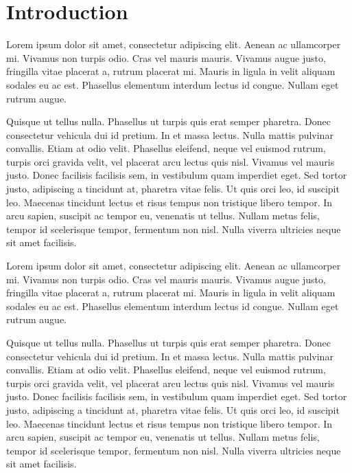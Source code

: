 \chapter{Introduction}

Lorem ipsum dolor sit amet, consectetur adipiscing elit. Aenean ac
ullamcorper mi. Vivamus non turpis odio. Cras vel mauris mauris. Vivamus
augue justo, fringilla vitae placerat a, rutrum placerat mi. Mauris in
ligula in velit aliquam sodales eu ac est. Phasellus elementum interdum
lectus id congue. Nullam eget rutrum augue.

Quisque ut tellus nulla. Phasellus ut turpis quis erat semper pharetra.
Donec consectetur vehicula dui id pretium. In et massa lectus. Nulla mattis
pulvinar convallis. Etiam at odio velit. Phasellus eleifend, neque vel
euismod rutrum, turpis orci gravida velit, vel placerat arcu lectus quis
nisl. Vivamus vel mauris justo. Donec facilisis facilisis sem, in vestibulum
quam imperdiet eget. Sed tortor justo, adipiscing a tincidunt at, pharetra
vitae felis. Ut quis orci leo, id suscipit leo. Maecenas tincidunt lectus et
risus tempus non tristique libero tempor. In arcu sapien, suscipit ac tempor
eu, venenatis ut tellus. Nullam metus felis, tempor id scelerisque tempor,
fermentum non nisl. Nulla viverra ultricies neque sit amet facilisis.

Lorem ipsum dolor sit amet, consectetur adipiscing elit. Aenean ac
ullamcorper mi. Vivamus non turpis odio. Cras vel mauris mauris. Vivamus
augue justo, fringilla vitae placerat a, rutrum placerat mi. Mauris in
ligula in velit aliquam sodales eu ac est. Phasellus elementum interdum
lectus id congue. Nullam eget rutrum augue.

Quisque ut tellus nulla. Phasellus ut turpis quis erat semper pharetra.
Donec consectetur vehicula dui id pretium. In et massa lectus. Nulla mattis
pulvinar convallis. Etiam at odio velit. Phasellus eleifend, neque vel
euismod rutrum, turpis orci gravida velit, vel placerat arcu lectus quis
nisl. Vivamus vel mauris justo. Donec facilisis facilisis sem, in vestibulum
quam imperdiet eget. Sed tortor justo, adipiscing a tincidunt at, pharetra
vitae felis. Ut quis orci leo, id suscipit leo. Maecenas tincidunt lectus et
risus tempus non tristique libero tempor. In arcu sapien, suscipit ac tempor
eu, venenatis ut tellus. Nullam metus felis, tempor id scelerisque tempor,
fermentum non nisl. Nulla viverra ultricies neque sit amet facilisis.
  
